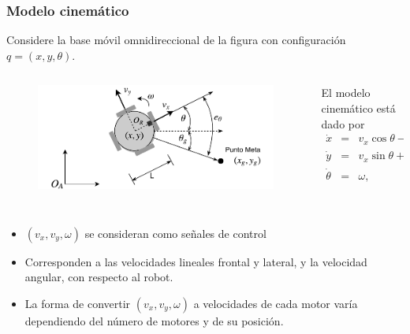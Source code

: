 \documentclass[10pt,spanish,aspectratio=1610]{beamer}
\begin{document}
\begin{frame}\frametitle{Modelo cinemático}
  Considere la base móvil omnidireccional de la figura con configuración $q=(x,y,\theta)$.
  \begin{columns}
    \begin{column}{0.5\textwidth}
      \begin{figure}
        \centering
        \includegraphics[width=\textwidth]{Figures/GoalPose.pdf}
      \end{figure}
    \end{column}
    \begin{column}{0.5\textwidth}
      El modelo cinemático está dado por
      \begin{eqnarray*} 
        \dot{x} &=& v_x\cos\theta - v_y\sin\theta\label{eq:Kinematic1}\\         
        \dot{y} &=& v_x\sin\theta + v_y\cos\theta\\ 
        \dot{\theta} &=& \omega,\label{eq:Kinematic3}
      \end{eqnarray*}
    \end{column}
  \end{columns}
  \[\]
  \begin{itemize}
  \item $(v_x, v_y, \omega)$ se consideran como señales de control
  \item Corresponden a las velocidades lineales frontal y lateral, y la velocidad angular, con respecto al robot.
  \item La forma de convertir $(v_x, v_y, \omega)$ a velocidades de cada motor varía dependiendo del número de motores y de su posición. 
  \end{itemize}
\end{frame}
\end{document}
